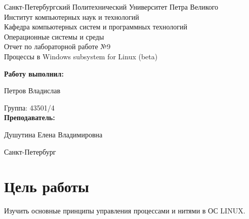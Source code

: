 \documentclass[a4paper]{article}
\begin{document}
\begin{titlepage} %

\begin{center} %

\large Санкт-Петербургский Политехнический Университет Петра Великого\\
\large Институт компьютерных наук и технологий \\
\large Кафедра компьютерных систем и программных технологий\\[6cm]

\huge Операционные системы и среды\\[0.5cm]
\large Отчет по лабораторной работе №9\\[0.1cm]
\large Процессы в Windows subsystem for Linux (beta)\\[5cm]
\end{center}

\begin{flushright}
\begin{minipage}{0.5\textwidth}
\begin{flushright}
\textbf{Работу выполнил:}

Петров Владислав

{Группа:} 43501/4\\


\textbf{Преподаватель:} 

Душутина Елена Владимировна
\end{flushright}
\end{minipage} %
\end{flushright} %

\vfill %

\begin{center}

\large Санкт-Петербург\\
\large \the\year %

\end{center} %

\thispagestyle{empty} %
\end{titlepage} %

\vfill %

\section{Цель работы}
	Изучить основные принципы управления процессами и нитями в ОС LINUX.
	
\end{document}
